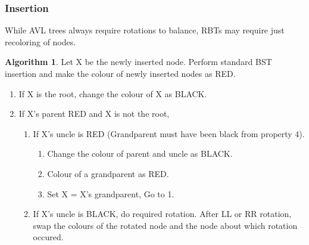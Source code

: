 \documentclass[10pt, a4paper]{extarticle}
\theoremstyle{definition}
\newtheorem{alg}{Algorithm}
\begin{document}
	\subsubsection{Insertion}
	While AVL trees always require rotations to balance, RBTs may require just recoloring of nodes.
	\begin{alg}
			Let X be the newly inserted node.
			Perform standard BST insertion and make the colour of newly inserted nodes as RED.
		\begin{enumerate}
			\item If X is the root, change the colour of X as BLACK.
			\item If X’s parent RED and X is not the root,
				\begin{enumerate}
					\item If X’s uncle is RED (Grandparent must have been black from property 4).
						\begin{enumerate}
							\item Change the colour of parent and uncle as BLACK.
							\item Colour of a grandparent as RED.
							\item Set X = X’s grandparent, Go to 1.
					\end{enumerate}
				\item If X’s uncle is BLACK, do required rotation. After LL or RR rotation, swap the colours of the rotated node and the node about which rotation occured.
			\end{enumerate}
	\end{enumerate}
	\end{alg}
\end{document}
